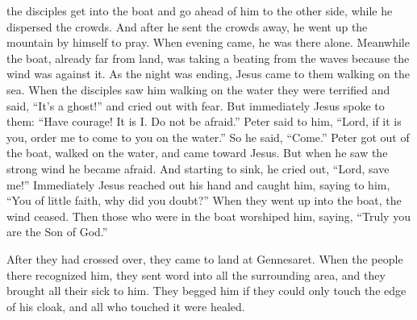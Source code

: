 {the disciples
get
into
the boat
and
go ahead
of him
to
the other side,
while
he dispersed
the crowds.
And
after he sent
the crowds
away,
he went up
the mountain
by
himself
to pray.
When
evening
came,
he was
there
alone.
Meanwhile
the boat,
already
far
from
land,
was taking
a beating
from
the waves
because
the wind
was
against it.
As the night
was ending,
Jesus came
to
them
walking
on
the sea.
When
the disciples
saw
him
walking
on
the water
they were terrified
and said,
“It’s
a ghost!” and
cried out
with
fear.
But
immediately
Jesus
spoke
to them: “Have courage! It is I.
Do
not
be afraid.”
Peter
said
to him, “Lord,
if
it is
you,
order
me
to come
to
you
on
the water.”
So
he said,
“Come.”
Peter
got
out
of the boat,
walked
on
the water,
and
came
toward
Jesus.
But
when
he saw
the strong wind
he became afraid.
And
starting
to sink,
he cried out, “Lord,
save
me!”
Immediately
Jesus
reached out
his hand
and caught
him,
saying
to him,
“You of little faith,
why
did you doubt?”
When
they
went up
into
the boat,
the wind
ceased.
Then those who were in
the boat
worshiped
him,
saying,
“Truly
you are
the Son
of God.”
\par }{\PP {}After
they had crossed over,
they came
to
land
at
Gennesaret.
When
the people
there
recognized
him,
they sent
word into
all
the surrounding area,
and
they brought
all
their
sick
to him.
They begged
him
if
they could
only
touch
the edge
of his
cloak,
and
all
who touched
it were healed.

}
